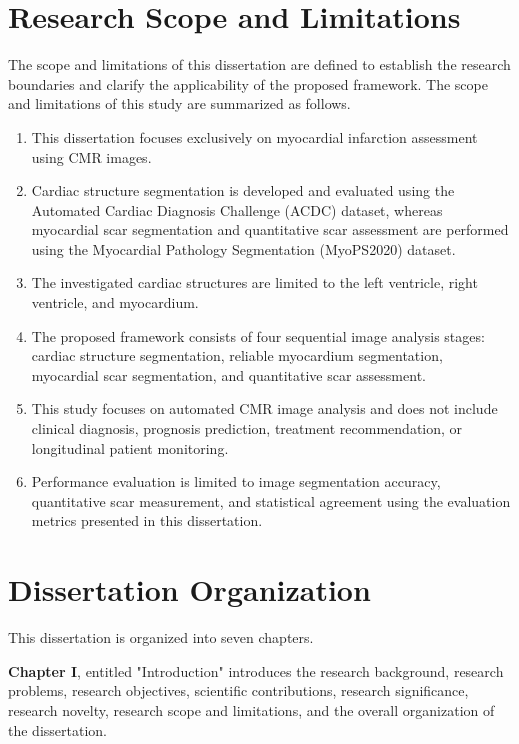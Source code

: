\section{Research Scope and Limitations}
\label{sec:research-scope}

The scope and limitations of this dissertation are defined to establish
the research boundaries and clarify the applicability of the proposed
framework. The scope and limitations of this study are summarized as
follows.

\begin{enumerate}
	\def\labelenumi{\arabic{enumi}.}
	\item
	This dissertation focuses exclusively on myocardial infarction
	assessment using CMR images.
	\item
	Cardiac structure segmentation is developed and evaluated using the
	Automated Cardiac Diagnosis Challenge (ACDC) dataset, whereas
	myocardial scar segmentation and quantitative scar assessment are
	performed using the Myocardial Pathology Segmentation (MyoPS2020)
	dataset.
	\item
	The investigated cardiac structures are limited to the left ventricle,
	right ventricle, and myocardium.
	\item
	The proposed framework consists of four sequential image analysis
	stages: cardiac structure segmentation, reliable myocardium
	segmentation, myocardial scar segmentation, and quantitative scar
	assessment.
	\item
	This study focuses on automated CMR image analysis and does not
	include clinical diagnosis, prognosis prediction, treatment
	recommendation, or longitudinal patient monitoring.
	\item
	Performance evaluation is limited to image segmentation accuracy,
	quantitative scar measurement, and statistical agreement using the
	evaluation metrics presented in this dissertation.
\end{enumerate}

\section{Dissertation Organization}
\label{sec:dissertation-organization}

This dissertation is organized into seven chapters.

\textbf{Chapter I}, entitled "Introduction" introduces the research background, research
problems, research objectives, scientific contributions, research
significance, research novelty, research scope and limitations, and the
overall organization of the dissertation.

